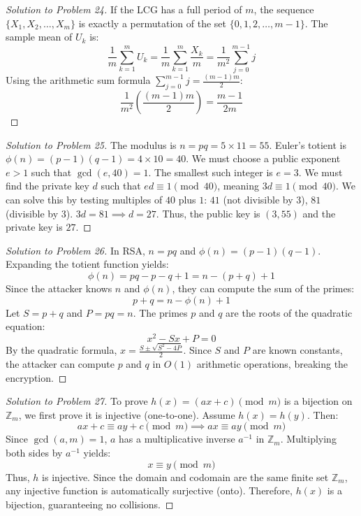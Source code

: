 \documentclass[11pt, a4paper]{article}
\theoremstyle{definition}
\theoremstyle{remark}
\newcommand{\Z}{\mathbb{Z}}
\begin{document}
\begin{proof}[Solution to Problem 24]
If the LCG has a full period of $m$, the sequence $\{X_1, X_2, \dots, X_m\}$ is exactly a permutation of the set $\{0, 1, 2, \dots, m-1\}$.
The sample mean of $U_k$ is:
\[ \frac{1}{m} \sum_{k=1}^m U_k = \frac{1}{m} \sum_{k=1}^m \frac{X_k}{m} = \frac{1}{m^2} \sum_{j=0}^{m-1} j \]
Using the arithmetic sum formula $\sum_{j=0}^{m-1} j = \frac{(m-1)m}{2}$:
\[ \frac{1}{m^2} \left( \frac{(m-1)m}{2} \right) = \frac{m-1}{2m} \]
\end{proof}

\begin{proof}[Solution to Problem 25]
The modulus is $n = pq = 5 \times 11 = 55$.
Euler's totient is $\phi(n) = (p-1)(q-1) = 4 \times 10 = 40$.
We must choose a public exponent $e > 1$ such that $\gcd(e, 40) = 1$. The smallest such integer is $e = 3$.
We must find the private key $d$ such that $ed \equiv 1 \pmod{40}$, meaning $3d \equiv 1 \pmod{40}$.
We can solve this by testing multiples of $40$ plus $1$: $41$ (not divisible by 3), $81$ (divisible by 3).
$3d = 81 \implies d = 27$.
Thus, the public key is $(3, 55)$ and the private key is $27$.
\end{proof}

\begin{proof}[Solution to Problem 26]
In RSA, $n = pq$ and $\phi(n) = (p-1)(q-1)$. Expanding the totient function yields:
\[ \phi(n) = pq - p - q + 1 = n - (p + q) + 1 \]
Since the attacker knows $n$ and $\phi(n)$, they can compute the sum of the primes:
\[ p + q = n - \phi(n) + 1 \]
Let $S = p + q$ and $P = pq = n$. The primes $p$ and $q$ are the roots of the quadratic equation:
\[ x^2 - Sx + P = 0 \]
By the quadratic formula, $x = \frac{S \pm \sqrt{S^2 - 4P}}{2}$. Since $S$ and $P$ are known constants, the attacker can compute $p$ and $q$ in $O(1)$ arithmetic operations, breaking the encryption.
\end{proof}

\begin{proof}[Solution to Problem 27]
To prove $h(x) = (ax + c) \pmod m$ is a bijection on $\Z_m$, we first prove it is injective (one-to-one).
Assume $h(x) = h(y)$. Then:
\[ ax + c \equiv ay + c \pmod m \implies ax \equiv ay \pmod m \]
Since $\gcd(a,m) = 1$, $a$ has a multiplicative inverse $a^{-1}$ in $\Z_m$. Multiplying both sides by $a^{-1}$ yields:
\[ x \equiv y \pmod m \]
Thus, $h$ is injective. Since the domain and codomain are the same finite set $\Z_m$, any injective function is automatically surjective (onto). Therefore, $h(x)$ is a bijection, guaranteeing no collisions.
\end{proof}
\end{document}
